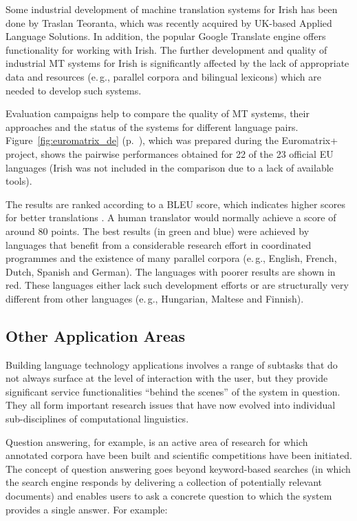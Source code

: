 \begin{multicols}{2}
Some industrial development of machine translation systems for Irish has been done by Traslan Teoranta, which was recently acquired by UK-based Applied Language Solutions. In addition, the popular Google Translate engine offers functionality for working with Irish. The further development and quality of industrial MT systems for Irish is significantly affected by the lack of appropriate data and resources (e.\,g., parallel corpora and bilingual lexicons) which are needed to develop such systems.

Evaluation campaigns help to compare the quality of MT systems, their approaches and the status of the systems for different language pairs. Figure~\ref{fig:euromatrix_de} (p.~\pageref{fig:euromatrix_de}), which was prepared during the Euromatrix+ project, shows the pairwise performances obtained for 22 of the 23 official EU languages (Irish was not included in the comparison due to a lack of available tools). 

The results are ranked according to a BLEU score, which indicates higher scores for better translations \cite{bleu1}. A human translator would normally achieve a score of around 80 points. The best results (in green and blue) were achieved by languages that benefit from a considerable research effort in coordinated programmes and the existence of many parallel corpora (e.\,g., English, French, Dutch, Spanish and German). The languages with poorer results are shown in red. These languages either lack such development efforts or are structurally very different from other languages (e.\,g., Hungarian, Maltese and Finnish).

\subsection{Other Application Areas}

Building language technology applications involves a range of subtasks that do not always surface at the level of interaction with the user, but they provide significant service functionalities ``behind the scenes'' of the system in question. They all form important research issues that have now evolved into individual sub-disciplines of computational linguistics. 

Question answering, for example, is an active area of research for which annotated corpora have been built and scientific competitions have been initiated. The concept of question answering goes beyond keyword-based searches (in which the search engine responds by delivering a collection of potentially relevant documents) and enables users to ask a concrete question to which the system provides a single answer. For example:


\end{multicols}
